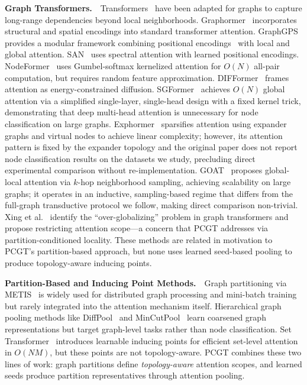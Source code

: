 \documentclass[manuscript, screen, review, anonymous]{acmart}
\begin{document}
\textbf{Graph Transformers.}~~Transformers~\cite{vaswani2017attention} have been adapted for graphs to capture long-range dependencies beyond local neighborhoods. Graphormer~\cite{ying2021graphormer} incorporates structural and spatial encodings into standard transformer attention. GraphGPS~\cite{rampasek2022graphgps} provides a modular framework combining positional encodings~\cite{dwivedi2022lspe} with local and global attention. SAN~\cite{kreuzer2021rethinking} uses spectral attention with learned positional encodings. NodeFormer~\cite{wu2022nodeformer} uses Gumbel-softmax kernelized attention for $O(N)$ all-pair computation, but requires random feature approximation. DIFFormer~\cite{wu2023difformer} frames attention as energy-constrained diffusion. SGFormer~\cite{wu2023sgformer} achieves $O(N)$ global attention via a simplified single-layer, single-head design with a fixed kernel trick, demonstrating that deep multi-head attention is unnecessary for node classification on large graphs. Exphormer~\cite{shirzad2023exphormer} sparsifies attention using expander graphs and virtual nodes to achieve linear complexity; however, its attention pattern is fixed by the expander topology and the original paper does not report node classification results on the datasets we study, precluding direct experimental comparison without re-implementation. GOAT~\cite{kong2023goat} proposes global-local attention via $k$-hop neighborhood sampling, achieving scalability on large graphs; it operates in an inductive, sampling-based regime that differs from the full-graph transductive protocol we follow, making direct comparison non-trivial. Xing et al.~\cite{xing2024less} identify the ``over-globalizing'' problem in graph transformers and propose restricting attention scope---a concern that PCGT addresses via partition-conditioned locality. These methods are related in motivation to PCGT's partition-based approach, but none uses learned seed-based pooling to produce topology-aware inducing points.

\textbf{Partition-Based and Inducing Point Methods.}~~Graph partitioning via METIS~\cite{karypis1998metis} is widely used for distributed graph processing and mini-batch training~\cite{chiang2019clustergcn} but rarely integrated into the attention mechanism itself. Hierarchical graph pooling methods like DiffPool~\cite{ying2018hierarchical} and MinCutPool~\cite{bianchi2020mincut} learn coarsened graph representations but target graph-level tasks rather than node classification. Set Transformer~\cite{lee2019set} introduces learnable inducing points for efficient set-level attention in $O(NM)$, but these points are not topology-aware. PCGT combines these two lines of work: graph partitions define \emph{topology-aware} attention scopes, and learned seeds produce partition representatives through attention pooling.
\end{document}
